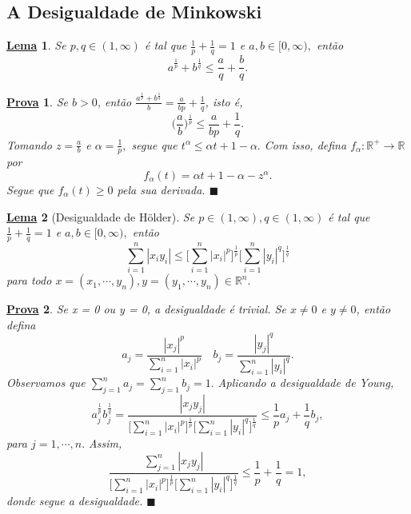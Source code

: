 \documentclass{article}
\newtheorem*{lemma*}{\underline{Lema}}
\newtheorem*{proof*}{\underline{Prova}}
\renewcommand\qedsymbol{$\blacksquare$}
\begin{document}
\subsection{A Desigualdade de Minkowski}
\begin{lemma*}
  Se \(p, q\in (1, \infty)\) é tal que \(\frac{1}{p} + \frac{1}{q} = 1\) e \(a, b\in [0, \infty),\) então 
    \[
      a^{\frac{1}{p}} + b^{\frac{1}{q}}\leq \frac{a}{q} + \frac{b}{q}.
    \]
\end{lemma*}
\begin{proof*}
  Se \(b > 0\), então \(\frac{a^{\frac{1}{p}}+b^{\frac{1}{q}}}{b} = \frac{a}{bp} + \frac{1}{q}\), isto é, 
    \[
      \biggl(\frac{a}{b}\biggr)^{\frac{1}{p}}\leq \frac{a}{bp} + \frac{1}{q}.
    \]
    Tomando \(z=\frac{a}{b}\) e \(\alpha =\frac{1}{p},\) segue que \(t^{\alpha }\leq \alpha t + 1 - \alpha.\) Com isso, defina 
  \(f_{\alpha }:\mathbb{R}^{+}\rightarrow \mathbb{R}\) por 
    \[
      f_{\alpha }(t) = \alpha t +1 - \alpha - z^{\alpha }.
    \]
    Segue que \(f_{\alpha }(t)\geq 0\) pela sua derivada. \qedsymbol
\end{proof*} 
\begin{lemma*}[Desigualdade de Hölder]
  Se \(p\in(1, \infty), q\in (1, \infty)\) é tal que \(\frac{1}{p}+\frac{1}{q}=1\) e \(a, b\in [0, \infty),\) então 
    \[
      \sum\limits_{i=1}^{n}|x_{i}y_{i}|\leq \biggl[\sum\limits_{i=1}^{n}|x_{i}|^{p}\biggr]^{\frac{1}{p}}\biggl[\sum\limits_{i=1}^{n}|y_{i}|^{q}\biggr]^{\frac{1}{q}}
    \] 
  para todo \(x=(x_{1}, \cdots, y_{n}), y=(y_{1}, \cdots, y_{n}) \in \mathbb{R}^{n}.\)
\end{lemma*}
\begin{proof*}
  Se x = 0 ou y = 0, a desigualdade é trivial. Se \(x\neq0\) e \(y\neq0\), então defina 
    \[
      a_{j} = \frac{|x_{j}|^{p}}{\sum\limits_{i=1}^{n}|x_{i}|^{p}}\quad b_{j}=\frac{|y_{j}|^{q}}{\sum\limits_{i=1}^{n}|y_{i}|^{q}}.
    \] 
  Observamos que \(\sum\limits_{j=1}^{n}a_{j} = \sum\limits_{j=1}^{n}b_{j}=1.\) Aplicando a desigualdade de Young, 
    \[
    a_{j}^{\frac{1}{p}}b_{j}^{\frac{1}{q}} = \frac{|x_{j}y_{j}|}{\biggl[\sum\limits_{i=1}^{n}|x_{i}|^{p}\biggr]^{\frac{1}{p}}\biggl[\sum\limits_{i=1}^{n}|y_{i}|^{q}\biggr]^{\frac{1}{q}}}\leq \frac{1}{p}a_{j} + \frac{1}{q}b_{j},
    \]
  para \(j=1, \cdots, n.\) Assim, 
    \[
      \frac{\sum\limits_{j=1}^{n}|x_{j}y_{j}|}{\biggl[\sum\limits_{i=1}^{n}|x_{i}|^{p}\biggr]^{\frac{1}{p}}\biggl[\sum\limits_{i=1}^{n}|y_{i}|^{q}\biggr]^{\frac{1}{q}}}\leq \frac{1}{p} + \frac{1}{q}=1,
    \]
  donde segue a desigualdade. \qedsymbol
\end{proof*}
\end{document}
